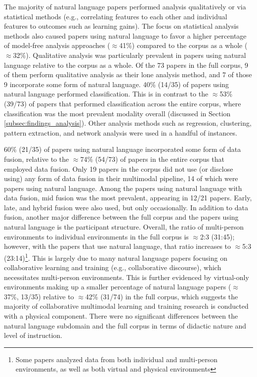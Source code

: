 \documentclass[manuscript,screen,review]{acmart}
\begin{document}
The majority of natural language papers performed analysis qualitatively or via statistical methods (e.g., correlating features to each other and individual features to outcomes such as learning gains). The focus on statistical analysis methods also caused papers using natural language to favor a higher percentage of model-free analysis approaches ($\approx$41\%) compared to the corpus as a whole ($\approx$32\%). Qualitative analysis was particularly prevalent in papers using natural language relative to the corpus as a whole. Of the 73 papers in the full corpus, 9 of them perform qualitative analysis as their lone analysis method, and 7 of those 9 incorporate some form of natural language. 40\% (14/35) of papers using natural language performed classification. This is in contrast to the $\approx$53\% (39/73) of papers that performed classification across the entire corpus, where classification was the most prevalent modality overall (discussed in Section \ref{subsec:findings_analysis}). Other analysis methods such as regression, clustering, pattern extraction, and network analysis were used in a handful of instances.

60\% (21/35) of papers using natural language incorporated some form of data fusion, relative to the $\approx$74\% (54/73) of papers in the entire corpus that employed data fusion. Only 19 papers in the corpus did not use (or disclose using) any form of data fusion in their multimodal pipeline, 14 of which were papers using natural language. Among the papers using natural language with data fusion, mid fusion was the most prevalent, appearing in 12/21 papers. Early, late, and hybrid fusion were also used, but only occasionally. In addition to data fusion, another major difference between the full corpus and the papers using natural language is the participant structure. Overall, the ratio of multi-person environments to individual environments in the full corpus is $\approx$2:3 (31:45); however, with the papers that use natural language, that ratio increases to $\approx$5:3 (23:14)\footnote{Some papers analyzed data from both individual and multi-person environments, as well as both virtual and physical environments}. This is largely due to many natural language papers focusing on collaborative learning and training (e.g., collaborative discourse), which necessitates multi-person environments. This is further evidenced by virtual-only environments making up a smaller percentage of natural language papers ($\approx$37\%, 13/35) relative to $\approx$42\% (31/74) in the full corpus, which suggests the majority of collaborative multimodal learning and training research is conducted with a physical component. There were no significant differences between the natural language subdomain and the full corpus in terms of didactic nature and level of instruction.
\end{document}

